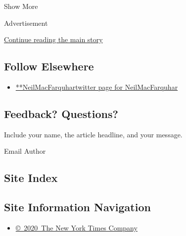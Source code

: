 Show More

Advertisement

\protect\hyperlink{after-mid2}{Continue reading the main story}

\hypertarget{follow-elsewhere}{%
\subsection{Follow Elsewhere}\label{follow-elsewhere}}

\begin{itemize}
\tightlist
\item
  \href{https://twitter.com/NeilMacFarquhar}{**NeilMacFarquhartwitter
  page for NeilMacFarquhar}
\end{itemize}

\hypertarget{feedback-questions}{%
\subsection{Feedback? Questions?}\label{feedback-questions}}

Include your name, the article headline, and your message.

Email Author

\hypertarget{site-index}{%
\subsection{Site Index}\label{site-index}}

\hypertarget{site-information-navigation}{%
\subsection{Site Information
Navigation}\label{site-information-navigation}}

\begin{itemize}
\tightlist
\item
  \href{https://help.nytimes3xbfgragh.onion/hc/en-us/articles/115014792127-Copyright-notice}{©~2020~The
  New York Times Company}
\end{itemize}

